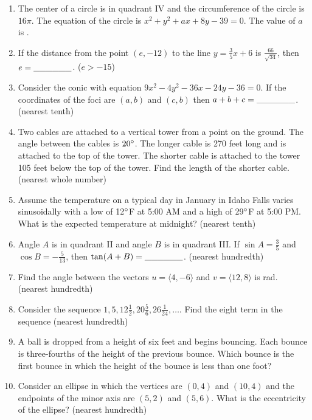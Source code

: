 \documentclass[../uilmath.tex]{subfiles}
\begin{document}
\begin{enumerate}[label=\bfseries\arabic*.]
    \item %
    The center of a circle is in quadrant IV and the circumference of the circle is $16\pi$. The equation of the circle is 
    $x^2+y^2+ax+8y-39=0$. The value of $a$ is \blank.

    \item %
    If the distance from the point $(e,-12)$ to the line $y=\frac{3}{5}x+6$ is 
    $\frac{66}{\sqrt{34}}$, then $e=\_\_\_\_\_\_$. ($e>-15$)

    \item %
    Consider the conic with equation $9x^2-4y^2-36x-24y-36=0$. If the coordinates of the foci are 
    $(a,b)$ and $(c,b)$ then $a+b+c=\_\_\_\_\_\_$. (nearest tenth)

    \item %
    Two cables are attached to a vertical tower from a point on the ground. The angle between the cables is $20\degree$. The longer cable is 270 feet long and is 
    attached to the top of the tower. The shorter cable is attached to the tower 105 feet below the top of the tower. Find the length of the shorter cable. (nearest whole number)

    \item %
    Assume the temperature on a typical day in January in Idaho Falls varies sinusoidally with a low of 12$\degree$F at 5:00 AM and a high of 29$\degree$F at 5:00 PM. What is the expected temperature at midnight? (nearest tenth)

    \item %
    Angle $A$ is in quadrant II and angle $B$ is in quadrant III. If $\sin A = \frac{3}{5}$ and $\cos B = -\frac{5}{13}$, then $\tan(A+B)=\_\_\_\_\_\_$. (nearest hundredth)

    \item %
    Find the angle between the vectors $u=\langle 4,-6\rangle$ and $v=\langle 12,8\rangle$ is \blank rad. (nearest hundredth)

    \item %
    Consider the sequence $1,5,12\frac{1}{2},20\frac{5}{6},26\frac{1}{24},\dots$. Find the eight term in the sequence (nearest hundredth)

    \item %
    A ball is dropped from a height of six feet and begins bouncing. Each bounce is three-fourths of the height of the previous bounce.
    Which bounce is the first bounce in which the height of the bounce is less than one foot?

    \item %
    Consider an ellipse in which the vertices are $(0,4)$ and $(10,4)$ and the endpoints of the minor axis are $(5,2)$ and $(5,6)$. What is the eccentricity of the ellipse? (nearest hundredth)


\end{enumerate}
\end{document}
